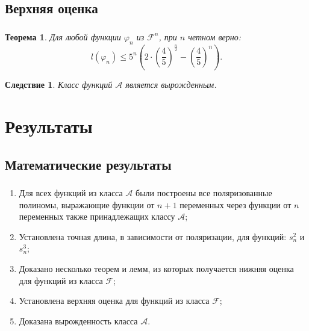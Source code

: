 \documentclass[t]{beamer}
\newtheorem{myth}{Теорема}
\newtheorem*{myco}{Следствие}
\begin{document}
\subsection{Верхняя оценка}
\begin{frame}
\frametitle{\insertsection}
\framesubtitle{\insertsubsection}
 {
\begin{myth}
\label{thh}
Для любой функции $\varphi_n$ из $\mathcal{F}^n$, при $n$ четном верно:
$$ l(\varphi_n) \leqslant 5^n\left(2\cdot\left(\frac{4}{5}\right)^{\frac{n}{2}} -
\left( \frac{4}{5} \right)^n\right).$$
\end{myth}
}
 {
\begin{myco}
Класс функций $\mathcal{A}$ является вырожденным.
\end{myco}
}
\end{frame}

\section{Результаты}
\subsection{Математические результаты}
\begin{frame}
\frametitle{\insertsection}
\framesubtitle{\insertsubsection}
\begin{enumerate}
\item Для всех функций из класса $\mathcal{A}$ были построены все поляризованные
полиномы, выражающие функции от $n+1$ переменных через функции от $n$ переменных также принадлежащих
классу $\mathcal{A}$;
\item<2-> Установлена точная длина, в зависимости от поляризации, для функций: $s^2_n$ и $s^3_n$;
\item<3-> Доказано несколько теорем и лемм, из которых получается нижняя оценка для функций из
класса $\mathcal{F}$;
\item<4-> Установлена верхняя оценка для функций из класса $\mathcal{F}$;
\item<5-> Доказана вырожденность класса $\mathcal{A}$.
\end{enumerate}
\end{frame}
\end{document}
